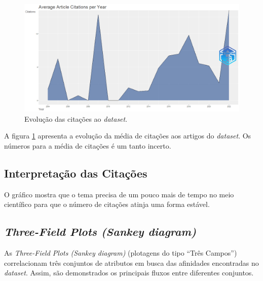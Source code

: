 \begin{figure}
    \centering
    \includegraphics[angle=0,width=1\textwidth]{experiments/CaioMassucato/PesquisaBibliometrica/DeepLearningHC/AverageArticleCitationPerYear-2022-02-10.png}
    \caption{Evolução das citações ao \textit{dataset}.}
    \label{fig:evol:anual:citacoes:DEEPLEARNINGHC@CaioMassucato}
\end{figure}

A figura \ref{fig:evol:anual:citacoes:DEEPLEARNINGHC@CaioMassucato} apresenta a evolução da média de citações aos artigos do \textit{dataset}. Os números para a média de citações é um tanto incerto.

\subsection{Interpretação das Citações}
O gráfico mostra que o tema precisa de um pouco mais de tempo no meio científico para que o número de citações atinja uma forma estável.

\subsection{\textit{Three-Field Plots (Sankey diagram)}}

As \textit{Three-Field Plots (Sankey diagram)} (plotagens do tipo ``Três Campos'') correlacionam três conjuntos de atributos em busca das afinidades encontradas no \textit{dataset}. Assim, são demonstrados os principais fluxos entre diferentes conjuntos.

